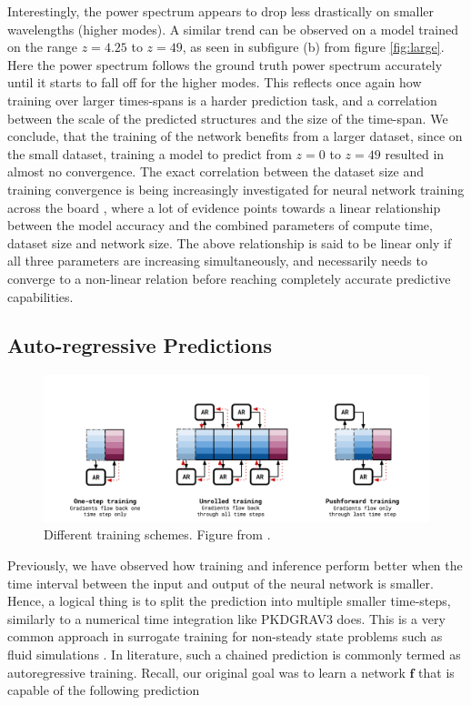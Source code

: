 \documentclass{article}
\begin{document}
Interestingly, the power spectrum appears to drop less drastically on smaller wavelengths (higher modes). A similar trend can be observed on a model trained on the range $z=4.25$ to $z=49$, as seen in subfigure (b) from figure \ref{fig:large}. Here the power spectrum follows the ground truth power spectrum accurately until it starts to fall off for the higher modes. This reflects once again how training over larger times-spans is a harder prediction task, and a correlation between the scale of the predicted structures and the size of the time-span. We conclude, that the training of the network benefits from a larger dataset, since on the small dataset, training a model to predict from $z=0$ to $z=49$ resulted in almost no convergence. The exact correlation between the dataset size and training convergence is being increasingly investigated for neural network training across the board \citep{kaplan2020scaling}, where a lot of evidence points towards a linear relationship between the model accuracy and the combined parameters of compute time, dataset size and network size. The above relationship is said to be linear only if all three parameters are increasing simultaneously, and necessarily needs to converge to a non-linear relation before reaching completely accurate predictive capabilities.


\subsection{Auto-regressive Predictions}

\begin{figure}[h]
    \centering
    \includegraphics[width=0.75\linewidth]{img/schemes.png}
    \caption{Different training schemes. Figure from \cite {brandstetter2022message}.}
    \label{fig:schemes-training}
\end{figure}


Previously, we have observed how training and inference perform better when the time interval between the input and output of the neural network is smaller. Hence, a logical thing is to split the prediction into multiple smaller time-steps, similarly to a numerical time integration like PKDGRAV3 does. This is a very common approach in surrogate training for non-steady state problems such as fluid simulations \citep{li2020fourier}. In literature, such a chained prediction is commonly termed as autoregressive training. Recall, our original goal was to learn a network $\mathbf{f}$ that is capable of the following prediction
\end{document}
